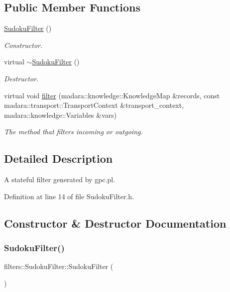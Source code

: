 \subsection*{Public Member Functions}
\begin{DoxyCompactItemize}
\item 
\hyperlink{classfilters_1_1SudokuFilter_a2715aa3b65666655525028dd16ac2f8b}{Sudoku\+Filter} ()
\begin{DoxyCompactList}\small\item\em Constructor. \end{DoxyCompactList}\item 
virtual \hyperlink{classfilters_1_1SudokuFilter_afd43981e802eb6cceb68cdeb381a6d69}{$\sim$\+Sudoku\+Filter} ()
\begin{DoxyCompactList}\small\item\em Destructor. \end{DoxyCompactList}\item 
virtual void \hyperlink{classfilters_1_1SudokuFilter_a45e7f165bbed159d73c5784d1a53bf2a}{filter} (madara\+::knowledge\+::\+Knowledge\+Map \&records, const madara\+::transport\+::\+Transport\+Context \&transport\+\_\+context, madara\+::knowledge\+::\+Variables \&vars)
\begin{DoxyCompactList}\small\item\em The method that filters incoming or outgoing. \end{DoxyCompactList}\end{DoxyCompactItemize}


\subsection{Detailed Description}
A stateful filter generated by gpc.\+pl. 

Definition at line 14 of file Sudoku\+Filter.\+h.



\subsection{Constructor \& Destructor Documentation}
\mbox{\label{classfilters_1_1SudokuFilter_a2715aa3b65666655525028dd16ac2f8b}} 
\subsubsection{\texorpdfstring{Sudoku\+Filter()}{SudokuFilter()}}
{\footnotesize\ttfamily filters\+::\+Sudoku\+Filter\+::\+Sudoku\+Filter (\begin{DoxyParamCaption}{ }\end{DoxyParamCaption})}



